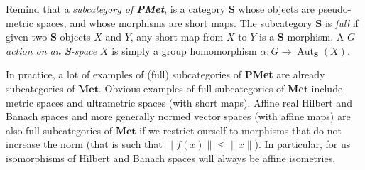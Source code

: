 \documentclass[a4paper]{article}
\theoremstyle{definition}
\newtheorem{defn}[lem]{Definition}
\DeclareMathOperator\Aut{Aut}
\newcommand*{\category}[1]{\textbf{#1}}
\newcommand*{\PMet}{\category{PMet}}
\newcommand*{\CatS}{\category{S}}
\begin{document}
Remind that a \emph{subcategory of \PMet}, is a category \CatS{} whose objects are pseudo-metric spaces, and whose morphisms are short maps.
The subcategory \CatS{} is \emph{full} if given two \CatS-objects $X$ and $Y$, any short map from $X$ to $Y$ is a \CatS-morphism.
A \emph{$G$ action on an \CatS-space} $X$ is simply a group homomorphism $\alpha\colon G\to\Aut_{\CatS}(X)$.
%
%

In practice, a lot of examples of (full) subcategories of \PMet{} are already subcategories of $\category{Met}$.
Obvious examples of full subcategories of $\category{Met}$ include metric spaces and ultrametric spaces (with short maps).
Affine real Hilbert and Banach spaces and more generally normed vector spaces (with affine maps) are also full subcategories of $\category{Met}$ if we restrict ourself to morphisms that do not increase the norm (that is such that  $\|f(x)\|\leq\| x\|$).
In particular, for us isomorphisms of Hilbert and Banach spaces will always be affine isometries.
\end{document}
